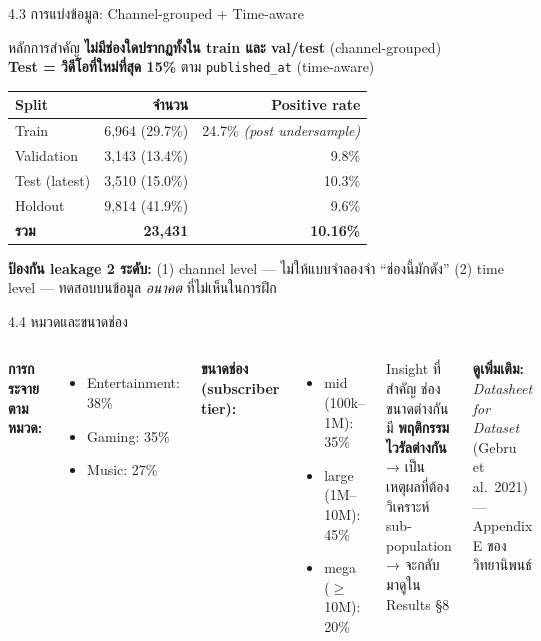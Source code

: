 \documentclass[aspectratio=169,11pt,xcolor=dvipsnames]{beamer}
\newcommand{\hl}[1]{\textcolor{kmitlOrange}{\textbf{#1}}}
\begin{document}
\begin{frame}{4.3 การแบ่งข้อมูล: Channel-grouped + Time-aware}
  \begin{block}{หลักการสำคัญ}
    \hl{ไม่มีช่องใดปรากฏทั้งใน train และ val/test} (channel-grouped) \\
    \hl{Test = วิดีโอที่ใหม่ที่สุด 15\%} ตาม \texttt{published\_at} (time-aware)
  \end{block}

  \begin{center}
    \begin{tabular}{lrr}
      \toprule
      \textbf{Split} & \textbf{จำนวน} & \textbf{Positive rate} \\
      \midrule
      Train          & 6{,}964 (29.7\%) & 24.7\% \emph{(post undersample)} \\
      Validation     & 3{,}143 (13.4\%) & 9.8\% \\
      Test (latest)  & 3{,}510 (15.0\%) & 10.3\% \\
      Holdout        & 9{,}814 (41.9\%) & 9.6\% \\
      \midrule
      \textbf{รวม}    & \textbf{23{,}431} & \textbf{10.16\%} \\
      \bottomrule
    \end{tabular}
  \end{center}

  \vspace{0.4em}
  \footnotesize
  \textbf{ป้องกัน leakage 2 ระดับ:} (1) channel level — ไม่ให้แบบจำลองจำ ``ช่องนี้มักดัง''
  (2) time level — ทดสอบบนข้อมูล \emph{อนาคต} ที่ไม่เห็นในการฝึก
\end{frame}

\begin{frame}{4.4 หมวดและขนาดช่อง}
  \begin{columns}[T]
    \textbf{การกระจายตามหมวด:}
    \begin{itemize}
      \item Entertainment: 38\%
      \item Gaming: 35\%
      \item Music: 27\%
    \end{itemize}
    \vspace{0.6em}
    \textbf{ขนาดช่อง (subscriber tier):}
    \begin{itemize}
      \item mid (100k--1M): 35\%
      \item large (1M--10M): 45\%
      \item mega ($\geq$10M): 20\%
    \end{itemize}
    \begin{block}{Insight ที่สำคัญ}
      ช่องขนาดต่างกันมี \hl{พฤติกรรมไวรัลต่างกัน}\\
      → เป็นเหตุผลที่ต้องวิเคราะห์ sub-population\\
      → จะกลับมาดูใน Results §8
    \end{block}
    \vspace{0.4em}
    \textbf{ดูเพิ่มเติม:} \emph{Datasheet for Dataset} (Gebru et al.\ 2021) — Appendix E ของวิทยานิพนธ์
  \end{columns}
\end{frame}
\end{document}
